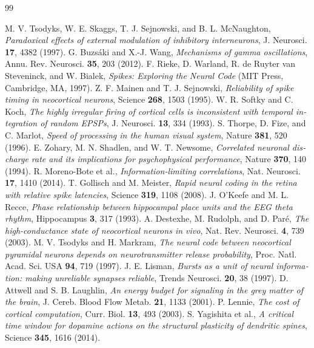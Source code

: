 \begin{thebibliography}{99}
\begin{otherlanguage}{english}
 M. V. Tsodyks, W. E. Skaggs, T. J. Sejnowski, and B. L. McNaughton, \emph{Paradoxical effects of external modulation of inhibitory interneurons}, J. Neurosci. \textbf{17}, 4382 (1997).
 G. Buzs\'aki and X.-J. Wang, \emph{Mechanisms of gamma oscillations}, Annu. Rev. Neurosci. \textbf{35}, 203 (2012).
 F. Rieke, D. Warland, R. de Ruyter van Steveninck, and W. Bialek, \emph{Spikes: Exploring the Neural Code} (MIT Press, Cambridge, MA, 1997).
 Z. F. Mainen and T. J. Sejnowski, \emph{Reliability of spike timing in neocortical neurons}, Science \textbf{268}, 1503 (1995).
 W. R. Softky and C. Koch, \emph{The highly irregular firing of cortical cells is inconsistent with temporal integration of random EPSPs}, J. Neurosci. \textbf{13}, 334 (1993).
 S. Thorpe, D. Fize, and C. Marlot, \emph{Speed of processing in the human visual system}, Nature \textbf{381}, 520 (1996).
 E. Zohary, M. N. Shadlen, and W. T. Newsome, \emph{Correlated neuronal discharge rate and its implications for psychophysical performance}, Nature \textbf{370}, 140 (1994).
 R. Moreno-Bote et al., \emph{Information-limiting correlations}, Nat. Neurosci. \textbf{17}, 1410 (2014).
 T. Gollisch and M. Meister, \emph{Rapid neural coding in the retina with relative spike latencies}, Science \textbf{319}, 1108 (2008).
 J. O'Keefe and M. L. Recce, \emph{Phase relationship between hippocampal place units and the EEG theta rhythm}, Hippocampus \textbf{3}, 317 (1993).
 A. Destexhe, M. Rudolph, and D. Par\'e, \emph{The high-conductance state of neocortical neurons in vivo}, Nat. Rev. Neurosci. \textbf{4}, 739 (2003).
 M. V. Tsodyks and H. Markram, \emph{The neural code between neocortical pyramidal neurons depends on neurotransmitter release probability}, Proc. Natl. Acad. Sci. USA \textbf{94}, 719 (1997).
 J. E. Lisman, \emph{Bursts as a unit of neural information: making unreliable synapses reliable}, Trends Neurosci. \textbf{20}, 38 (1997).
 D. Attwell and S. B. Laughlin, \emph{An energy budget for signaling in the grey matter of the brain}, J. Cereb. Blood Flow Metab. \textbf{21}, 1133 (2001).
 P. Lennie, \emph{The cost of cortical computation}, Curr. Biol. \textbf{13}, 493 (2003).
 S. Yagishita et al., \emph{A critical time window for dopamine actions on the structural plasticity of dendritic spines}, Science \textbf{345}, 1616 (2014).

\end{otherlanguage}
\end{thebibliography}
